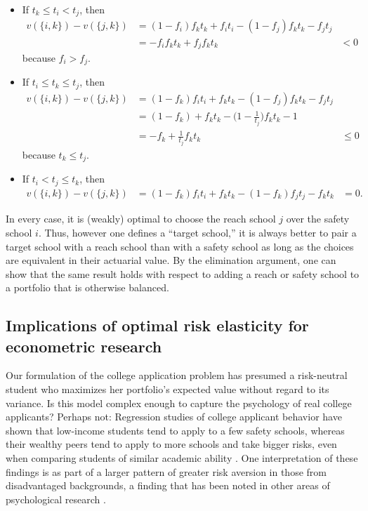 \begin{itemize}
\item If $t_k \leq t_i < t_j$, then 
\begin{align*}
v(\{i, k\}) -  v(\{j, k\}) &= (1 - f_i) f_k t_k  + f_i t_i - (1 - f_j) f_k t_k - f_j t_j \\
&=  - f_i f_k t_k + f_j f_k t_k &< 0
\end{align*}
because $f_i > f_j$. 
\item If  $t_i \leq t_k \leq t_j$, then 
\begin{align*}
v(\{i, k\}) -  v(\{j, k\}) &= (1 - f_k ) f_i t_i + f_k t_k - (1 - f_j) f_k t_k - f_j t_j \\
&= (1 - f_k) + f_k t_k - \bigl( 1 - \frac{1}{t_j}\bigr) f_k t_k - 1  \\
&=  - f_k + \frac{1}{t_j} f_k t_k & \leq 0
\end{align*}
because $t_k \leq t_j$.
\item If $t_i < t_j \leq t_k$, then 
\begin{align*}
v(\{i, k\}) -  v(\{j, k\}) &=  (1 - f_k) f_i t_i + f_k t_k - (1 - f_k) f_j t_j - f_k t_k &= 0.
\end{align*}
\end{itemize}

\noindent In every case, it is (weakly) optimal to choose the reach school $j$ over the safety school $i$. Thus, however one defines a ``target school,'' it is always better to pair a target school with a reach school than with a safety school as long as the choices are equivalent in their actuarial value. By the elimination argument, one can show that the same result holds with respect to adding a reach or safety school to a portfolio that is otherwise balanced.

\subsection{Implications of optimal risk elasticity for econometric research} \label{subsectionRiskAversionEconometrics}

Our formulation of the college application problem has presumed a risk-neutral student who maximizes her portfolio's expected value without regard to its variance. Is this model complex enough to capture the psychology of real college applicants? Perhaps not: Regression studies of college applicant behavior have shown that low-income students tend to apply to a few safety schools, whereas their wealthy peers tend to apply to more schools and take bigger risks, even when comparing students of similar academic ability \cite{hoxbyandavery2012}. One interpretation of these findings is as part of a larger pattern of greater risk aversion in those from disadvantaged backgrounds, a finding that has been noted in other areas of psychological research \cite{hartlaubandschneider2012,wattsetal2018,vanhuizenandalessie2019}.

